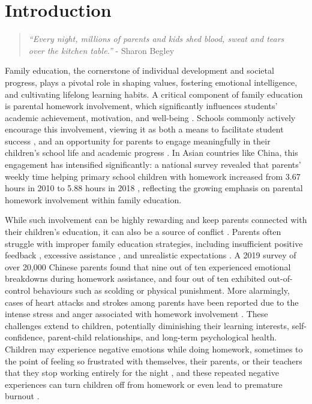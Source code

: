 \section{Introduction}

\begin{quote}
    \centering
   \textit{``Every night, millions of parents and kids shed blood, sweat and tears 
   \\over the kitchen table.''} - Sharon Begley \cite{begley1998homework}
\end{quote}

Family education, the cornerstone of individual development and societal progress, plays a pivotal role in shaping values, fostering emotional intelligence, and cultivating lifelong learning habits. A critical component of family education is parental homework involvement, which significantly influences students' academic achievement, motivation, and well-being \cite{patall2008parent, dettmers2019antecedents}. Schools commonly actively encourage this involvement, viewing it as both a means to facilitate student success \cite{cooper1989synthesis}, and an opportunity for parents to engage meaningfully in their children’s school life and academic progress \cite{heimgartner2012more}. In Asian countries like China, this engagement has intensified significantly: a national survey revealed that parents' weekly time helping primary school children with homework increased from 3.67 hours in 2010 to 5.88 hours in 2018  \cite{iccs}, reflecting the growing emphasis on parental homework involvement within family education.


While such involvement can be highly rewarding and keep parents connected with their children's education, it can also be a source of conflict \cite{solomon2002helping, patall2008parent}. Parents often struggle with improper family education strategies, including insufficient positive feedback \cite{pomerantz2007whom}, excessive assistance \cite{patall2008parent}, and unrealistic expectations \cite{pomerantz2007whom, cunha2015parents}. A 2019 survey of over 20,000 Chinese parents \cite{iccs} found that nine out of ten experienced emotional breakdowns during homework assistance, and four out of ten exhibited out-of-control behaviours such as scolding or physical punishment. More alarmingly, cases of heart attacks and strokes among parents have been reported due to the intense stress and anger associated with homework involvement \cite{news_Mailonline_2020,news_Nov_Nov_2020}. These challenges extend to children, potentially diminishing their learning interests, self-confidence, parent-child relationships, and long-term psychological health. Children may experience negative emotions while doing homework, sometimes to the point of feeling so frustrated with themselves, their parents, or their teachers that they stop working entirely for the night \cite{xu2005homework}, and these repeated negative experiences can turn children off from homework or even lead to premature burnout \cite{corno2004homework}.  

